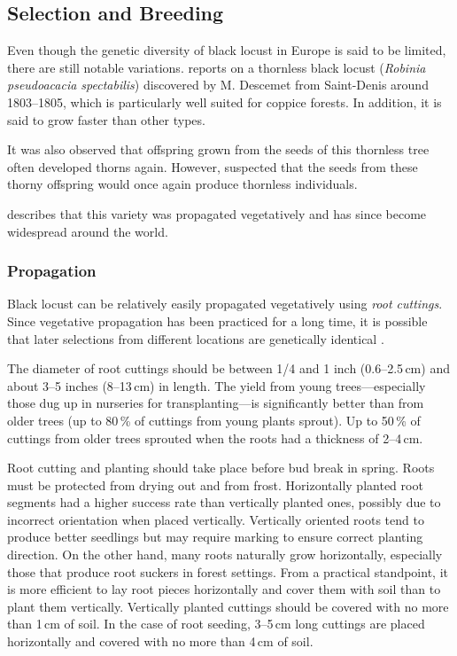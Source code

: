\subsection{Selection and Breeding}

Even though the genetic diversity of black locust in Europe is said to be limited, there are still notable variations. \citet[pp.~259--260]{Michaux1813arbres} reports on a thornless black locust (\emph{Robinia pseudoacacia spectabilis}) discovered by M. Descemet from Saint-Denis around 1803–1805, which is particularly well suited for coppice forests. In addition, it is said to grow faster than other types.

It was also observed that offspring grown from the seeds of this thornless tree often developed thorns again. However, \citet{Michaux1813arbres} suspected that the seeds from these thorny offspring would once again produce thornless individuals.

\citet[p.~173]{quatrefages1861robinie} describes that this variety was propagated vegetatively and has since become widespread around the world.


\subsubsection{Propagation}

Black locust can be relatively easily propagated vegetatively using \emph{root cuttings}. Since vegetative propagation has been practiced for a long time, it is possible that later selections from different locations are genetically identical \citep{liesebach2012robinie}.

The diameter of root cuttings should be between 1/4 and 1 inch (0.6–2.5\,cm) and about 3–5 inches (8–13\,cm) in length. The yield from young trees—especially those dug up in nurseries for transplanting—is significantly better than from older trees (up to 80\,\% of cuttings from young plants sprout). Up to 50\,\% of cuttings from older trees sprouted when the roots had a thickness of 2–4\,cm.

Root cutting and planting should take place before bud break in spring. Roots must be protected from drying out and from frost. Horizontally planted root segments had a higher success rate than vertically planted ones, possibly due to incorrect orientation when placed vertically. Vertically oriented roots tend to produce better seedlings but may require marking to ensure correct planting direction. On the other hand, many roots naturally grow horizontally, especially those that produce root suckers in forest settings. From a practical standpoint, it is more efficient to lay root pieces horizontally and cover them with soil than to plant them vertically. Vertically planted cuttings should be covered with no more than 1\,cm of soil. In the case of root seeding, 3–5\,cm long cuttings are placed horizontally and covered with no more than 4\,cm of soil.


